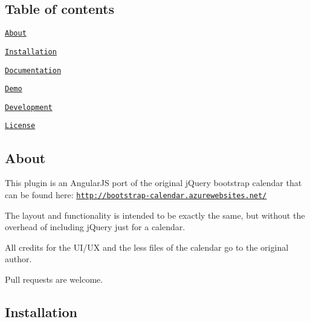 \href{https://gitter.im/mattlewis92/angular-bootstrap-calendar?utm_source=badge&utm_medium=badge&utm_campaign=pr-badge}{\tt } \href{https://travis-ci.org/mattlewis92/angular-bootstrap-calendar}{\tt } \href{http://badge.fury.io/bo/angular-bootstrap-calendar}{\tt } \href{http://badge.fury.io/js/angular-bootstrap-calendar}{\tt } \href{https://david-dm.org/mattlewis92/angular-bootstrap-calendar#info=peerDependencies}{\tt } \href{https://david-dm.org/mattlewis92/angular-bootstrap-calendar#info=devDependencies}{\tt } \href{https://github.com/mattlewis92/angular-bootstrap-calendar/issues}{\tt } \href{https://github.com/mattlewis92/angular-bootstrap-calendar/stargazers}{\tt } \href{https://raw.githubusercontent.com/mattlewis92/angular-bootstrap-calendar/master/LICENSE}{\tt }

\subsection*{Table of contents}


\begin{DoxyItemize}
\item \href{#about}{\tt About}
\item \href{#installation}{\tt Installation}
\item \href{#documentation}{\tt Documentation}
\item \href{#demo}{\tt Demo}
\item \href{#development}{\tt Development}
\item \href{#licence}{\tt License}
\end{DoxyItemize}

\subsection*{About}

This plugin is an Angular\+JS port of the original j\+Query bootstrap calendar that can be found here\+: \href{http://bootstrap-calendar.azurewebsites.net/}{\tt http\+://bootstrap-\/calendar.\+azurewebsites.\+net/}

The layout and functionality is intended to be exactly the same, but without the overhead of including j\+Query just for a calendar.

All credits for the U\+I/\+UX and the less files of the calendar go to the original author.

Pull requests are welcome.

\subsection*{Installation}


